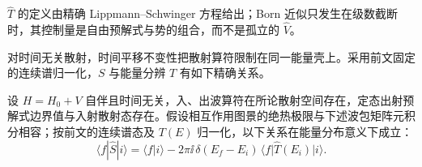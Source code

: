 $\hat T$ 的定义由精确 Lippmann--Schwinger 方程给出；Born 近似只发生在级数截断时，其控制量是自由预解式与势的组合，而不是孤立的 $\hat V$。

对时间无关散射，时间平移不变性把散射算符限制在同一能量壳上。采用前文固定的连续谱归一化，$S$ 与能量分辨 $T$ 有如下精确关系。
\begin{proposition}[定态散射的能量壳关系]
设 $H=H_0+V$ 自伴且时间无关，入、出波算符在所论散射空间存在，定态出射预解式边界值与入射散射态存在。假设相互作用图景的绝热极限与下述波包矩阵元积分相容；按前文的连续谱态及 $T(E)$ 归一化，以下关系在能量分布意义下成立：
\begin{equation}
 {
 \langle f|\hat S|i\rangle
 =\langle f|i\rangle
 -2\pi\ii\,\delta(E_f-E_i)\,
 \langle f|\hat T(E_i)|i\rangle.}
 \label{eq:S-T-energy-r68}
\end{equation}
\end{proposition}
